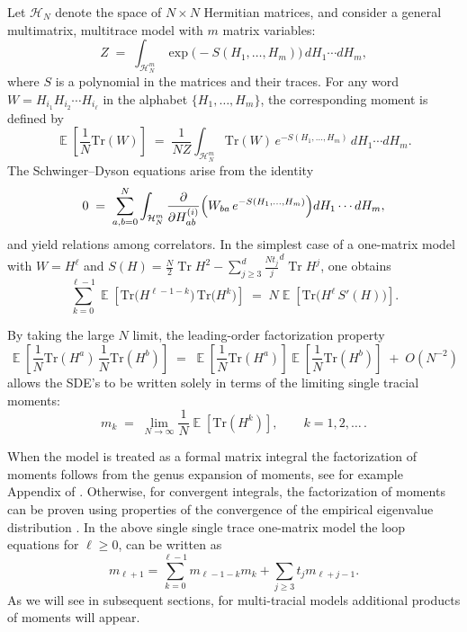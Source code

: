 \documentclass[11pt]{article}
\theoremstyle{plain}
\DeclareMathOperator{\tr}{Tr}
\DeclareMathOperator{\ex}{\mathbb{E}}
\begin{document}
Let $\mathcal{H}_N$ denote the space of $N\times N$ Hermitian matrices, and consider a general multimatrix,
multitrace model with $m$ matrix variables:
\[
Z \;=\; \int_{\mathcal{H}_N^m} \exp\!\bigl( - S(H_1,\dots,H_m) \bigr)\, dH_1\cdots dH_m,
\]
where $S$ is a polynomial in the matrices and their traces. For any word
$W = H_{i_1} H_{i_2} \cdots H_{i_\ell}$ in the alphabet $\{H_1,\dots,H_m\}$, the corresponding moment is defined
by
\[
\ex \left[ \frac{1}{N}\mathrm{Tr}(W) \right]
  \;=\;
  \frac{1}{N Z}
  \int_{\mathcal{H}_N^m}
     \mathrm{Tr}(W)\, e^{-S(H_1,\dots,H_m)}\, dH_1\cdots dH_m.
\]
The Schwinger--Dyson equations arise from the identity
\[
0 \;=\; \sum_{a,b=0}^{N}\int_{\mathcal{H}_{N}^{m}} \frac{\partial}{\partial H_{a b}^{(i)}}\Bigl( W_{b a}\, e^{-S(H_{1},...,H_{m})} \Bigr)dH_{1}\cdots dH_{m},
\]
and yield relations among correlators. In the simplest case of a one-matrix model with $W=H^\ell$ and $S(H)= \frac{N}{2}\tr H^{2}- \sum_{j\geq 3}^{d} \frac{N t_{j}}{j}^{d} \tr H^{j}$,
one obtains
\[
\sum_{k=0}^{\ell-1}
  \ex \left[ \mathrm{Tr}\bigl( H^{\ell-1-k} \bigr)\,
              \mathrm{Tr}\bigl( H^{k} \bigr) \right]
  \;=\;
  N \ex\left[ \mathrm{Tr}\bigl( H^{\ell}\, S'(H) \bigr) \right].
\] 

By taking the large $N$ limit, the leading-order factorization property
\[
\ex \left[ \frac{1}{N}\mathrm{Tr}(H^a)\, \frac{1}{N}\mathrm{Tr}(H^b) \right]
  \;=\;
  \ex \left[ \frac{1}{N}\mathrm{Tr}(H^a) \right]
  \ex \left[\frac{1}{N}\mathrm{Tr}(H^b) \right]
  \;+\; O(N^{-2})
\]
allows the SDE's to be written solely in terms of the limiting single tracial moments:
\[
m_k \;=\; \lim_{N\to\infty} \frac{1}{N}\ex \left[ \mathrm{Tr}(H^k) \right],\qquad k=1,2,\dots\,.
\]

When the model is treated as a formal matrix integral the factorization of moments follows from the genus expansion of moments, see for example Appendix of \cite{Khalkhali2022}. Otherwise, for convergent integrals, the factorization of moments can be proven using properties of the convergence of the empirical eigenvalue distribution \cite{Johansson,Khalkhali2025 large N limit}. In the above single  single trace one-matrix model the loop equations for $\ell\geq 0$, can be written as 
\begin{equation*}
	m_{\ell+1} = \sum_{k=0}^{\ell-1}m_{\ell-1-k}m_{k} +\sum_{j\geq 3} t_{j} m_{\ell+j-1}. 
\end{equation*}
As we will see in subsequent sections, for multi-tracial models additional products of moments will appear. 
\end{document}
